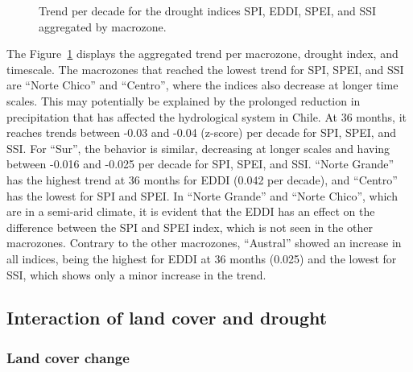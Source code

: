 \documentclass[
  authoryear,
  preprint,
  3p,
  onecolumn]{elsarticle}
\begin{document}
\elandscape

\begin{figure}[!ht]


\caption{\label{fig-trendDIMacro}Trend per decade for the drought
indices SPI, EDDI, SPEI, and SSI aggregated by macrozone.}

\end{figure}%

The Figure~\ref{fig-trendDIMacro} displays the aggregated trend per
macrozone, drought index, and timescale. The macrozones that reached the
lowest trend for SPI, SPEI, and SSI are ``Norte Chico'' and ``Centro'',
where the indices also decrease at longer time scales. This may
potentially be explained by the prolonged reduction in precipitation
that has affected the hydrological system in Chile. At 36 months, it
reaches trends between -0.03 and -0.04 (z-score) per decade for SPI,
SPEI, and SSI. For ``Sur'', the behavior is similar, decreasing at
longer scales and having between -0.016 and -0.025 per decade for SPI,
SPEI, and SSI. ``Norte Grande'' has the highest trend at 36 months for
EDDI (0.042 per decade), and ``Centro'' has the lowest for SPI and SPEI.
In ``Norte Grande'' and ``Norte Chico'', which are in a semi-arid
climate, it is evident that the EDDI has an effect on the difference
between the SPI and SPEI index, which is not seen in the other
macrozones. Contrary to the other macrozones, ``Austral'' showed an
increase in all indices, being the highest for EDDI at 36 months (0.025)
and the lowest for SSI, which shows only a minor increase in the trend.

\subsection{Interaction of land cover and
drought}\label{interaction-of-land-cover-and-drought-1}

\subsubsection{Land cover change}\label{land-cover-change-1}
\end{document}

